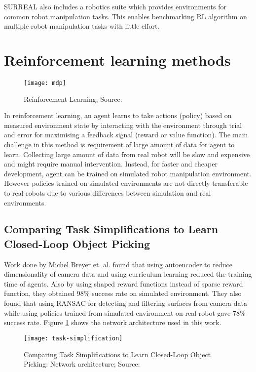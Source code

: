 SURREAL also includes a robotics suite which provides environments for common robot manipulation tasks. This enables benchmarking RL algorithm on multiple robot manipulation tasks with little effort.

\section{Reinforcement learning methods}
\begin{figure}[H]
	\centering
	\texttt{[image: mdp]}
	\caption{Reinforcement Learning; Source: \cite{sutton}}
\end{figure}

In reinforcement learning, an agent learns to take actions (policy) based on measured environment state by interacting with the environment through trial and error for maximising a feedback signal (reward or value function). The main challenge in this method is requirement of large amount of data for agent to learn. Collecting large amount of data from real robot will be slow and expensive and might require manual intervention. Instead, for faster and cheaper development, agent can be trained on simulated robot manipulation environment. However policies trained on simulated environments are not directly transferable to real robots due to various differences between simulation and real environments.

\subsection{Comparing Task Simplifications to Learn Closed-Loop Object Picking}
Work done by Michel Breyer et. al. \cite{tasksimplification} found that using autoencoder to reduce dimensionality of camera data and using curriculum learning reduced the training time of agents. Also by using shaped reward functions instead of sparse reward function, they obtained 98\% success rate on simulated environment. They also found that using RANSAC for detecting and filtering surfaces from camera data while using policies trained from simulated environment on real robot gave 78\% success rate. Figure \ref{fig:tasksimplification-network} shows the network architecture used in this work.

\begin{figure}[H]
	\centering
	\texttt{[image: task-simplification]}
	\caption{Comparing Task Simplifications to Learn Closed-Loop Object Picking: Network architecture; Source: \cite{tasksimplification}}
	\label{fig:tasksimplification-network}
\end{figure}

